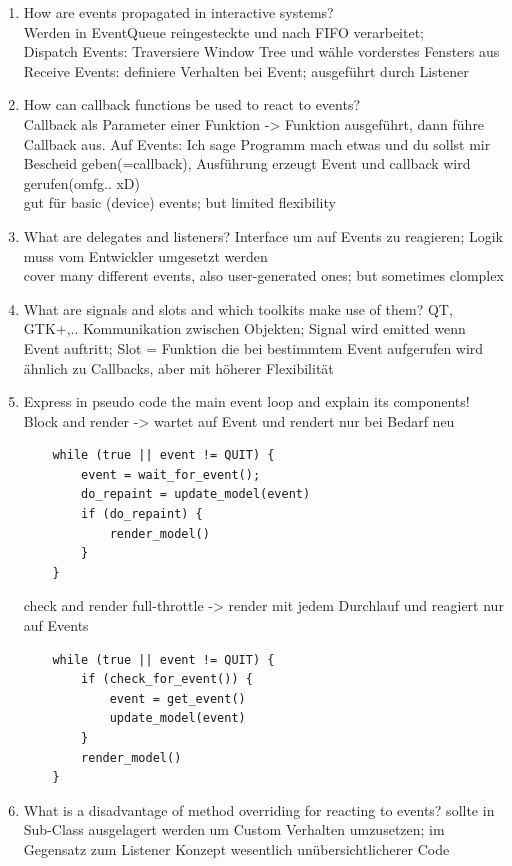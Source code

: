 \begin{enumerate}
	\item How are events propagated in interactive systems?\\
	Werden in EventQueue reingesteckte und nach FIFO verarbeitet;\\
	Dispatch Events: Traversiere Window Tree und wähle vorderstes Fensters aus\\
	Receive Events: definiere Verhalten bei Event; ausgeführt durch Listener
	
	\item How can callback functions be used to react to events?\\
	Callback als Parameter einer Funktion -> Funktion ausgeführt, dann führe Callback aus. Auf Events: Ich sage Programm mach etwas und du sollst mir Bescheid geben(=callback), Ausführung erzeugt Event und callback wird gerufen(omfg.. xD)\\
	gut für basic (device) events; but limited flexibility
	
	\item What are delegates and listeners?
	Interface um auf Events zu reagieren; Logik muss vom Entwickler umgesetzt werden\\
	cover many different events, also user-generated ones; but sometimes clomplex
	
	\item What are signals and slots and which toolkits make use of them?
	QT, GTK+,.. Kommunikation zwischen Objekten; Signal wird emitted wenn Event auftritt; Slot = Funktion die bei bestimmtem Event aufgerufen wird\\
	ähnlich zu Callbacks, aber mit höherer Flexibilität
	
	\item Express in pseudo code the main event loop and explain its components!\\
	Block and render -> wartet auf Event und rendert nur bei Bedarf neu
	\begin{lstlisting}
	while (true || event != QUIT) {
		event = wait_for_event();
		do_repaint = update_model(event)
		if (do_repaint) {
			render_model()
		}
	}
	\end{lstlisting}
	check and render full-throttle -> render mit jedem Durchlauf und reagiert nur auf Events
	\begin{lstlisting}
	while (true || event != QUIT) {
		if (check_for_event()) {
			event = get_event()
			update_model(event)
		}
		render_model()
	}
	\end{lstlisting}
		
	\item What is a disadvantage of method overriding for reacting to events?
	sollte in Sub-Class ausgelagert werden um Custom Verhalten umzusetzen; im Gegensatz zum Listener Konzept wesentlich unübersichtlicherer Code
	
\end{enumerate}